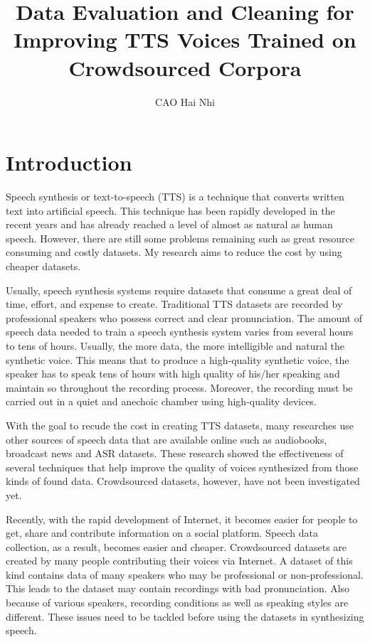 \documentclass[12pt]{article}
\title{Data Evaluation and Cleaning for Improving TTS Voices Trained on Crowdsourced Corpora}
\author{CAO Hai Nhi}
\begin{document}
\titlepage
\cmemberspage
\firstabstract
%
%
\toc
\newpage
\listoffigures

\listoftables
%
%
\newpage


\section{Introduction}
Speech synthesis or text-to-speech (TTS) is a technique that converts written text into artificial speech. This technique has been rapidly developed in the recent years and has already reached a level of almost as natural as human speech. However, there are still some problems remaining such as great resource consuming and costly datasets. My research aims to reduce the cost by using cheaper datasets.

Usually, speech synthesis systems require datasets that consume a great deal of time, effort, and expense to create. Traditional TTS datasets are recorded by professional speakers who possess correct and clear pronunciation. The amount of speech data needed to train a speech synthesis system varies from several hours to tens of hours. Usually, the more data, the more intelligible and natural the synthetic voice. This means that to produce a high-quality synthetic voice, the speaker has to speak tens of hours with high quality of his/her speaking and maintain so throughout the recording process. Moreover, the recording must be carried out in a quiet and anechoic chamber using high-quality devices.

With the goal to recude the cost in creating TTS datasets, many researches use other sources of speech data that are available online such as audiobooks, broadcast news and ASR datasets. These research showed the effectiveness of several techniques that help improve the quality of voices synthesized from those kinds of found data. Crowdsourced datasets, however, have not been investigated yet.

Recently, with the rapid development of Internet, it becomes easier for people to get, share and contribute information on a social platform. Speech data collection, as a result, becomes easier and cheaper. Crowdsourced datasets are created by many people contributing their voices via Internet. A dataset of this kind contains data of many speakers who may be professional or non-professional. This leads to the dataset may contain recordings with bad pronunciation. Also because of various speakers, recording conditions as well as speaking styles are different. These issues need to be tackled before using the datasets in synthesizing speech.
\end{document}
